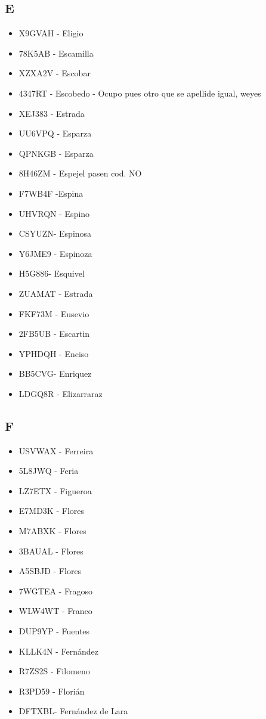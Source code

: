 \subsection*{E}
\begin{itemize}[leftmargin=*,nosep]
\item X9GVAH  -  Eligio
\item 78K5AB - Escamilla
\item XZXA2V  -  Escobar
\item 4347RT  -  Escobedo - Ocupo pues otro que se apellide igual, weyes
\item XEJ383 - Estrada
\item UU6VPQ - Esparza
\item QPNKGB - Esparza
\item 8H46ZM - Espejel pasen cod. NO
\item F7WB4F -Espina
\item UHVRQN - Espino
\item CSYUZN- Espinosa
\item Y6JME9  -  Espinoza
\item H5G886- Esquivel
\item ZUAMAT  -  Estrada
\item FKF73M - Eusevio
\item 2FB5UB - Escartin
\item YPHDQH - Enciso
\item BB5CVG- Enriquez
\item LDGQ8R - Elizarraraz
\end{itemize}

\subsection*{F}
\begin{itemize}[leftmargin=*,nosep]
\item USVWAX  -  Ferreira
\item 5L8JWQ - Feria
\item LZ7ETX - Figueroa
\item E7MD3K - Flores
\item M7ABXK - Flores
\item 3BAUAL  -  Flores
\item A5SBJD  -  Flores
\item 7WGTEA  -  Fragoso
\item WLW4WT - Franco
\item DUP9YP  -  Fuentes
\item KLLK4N - Fernández
\item R7ZS2S - Filomeno
\item R3PD59 - Florián
\item DFTXBL- Fernández de Lara
\end{itemize}

